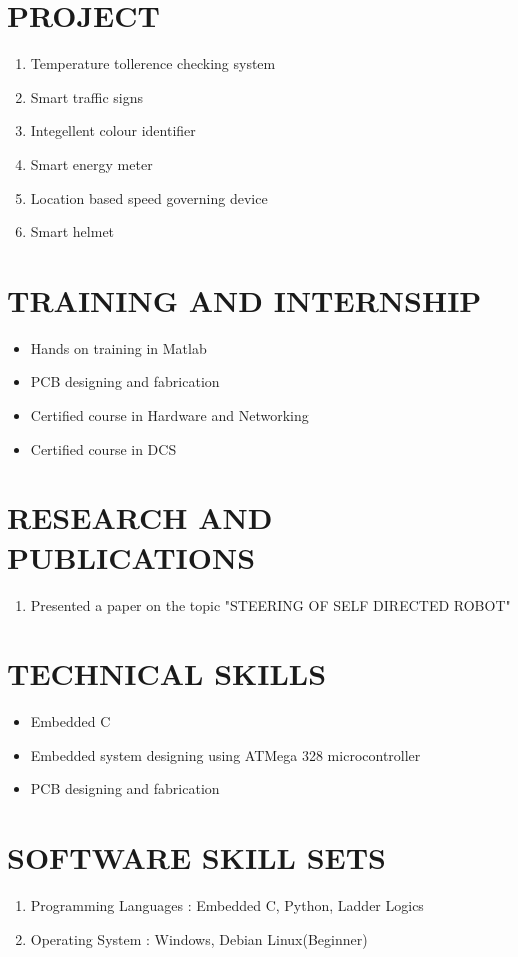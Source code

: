 \documentclass{My_CV_Class}
\begin{document}
\section{\textcolor{mycolor}{PROJECT}}
\begin{enumerate} 
	\item Temperature tollerence checking system
	\item Smart traffic signs
	\item Integellent colour identifier
	\item Smart energy meter
	\item Location based speed governing device
	\item Smart helmet
\end{enumerate}
\section{\textcolor{mycolor}{TRAINING AND INTERNSHIP}}
\begin{itemize}
	\item Hands on training in Matlab
	\item PCB designing and fabrication
	\item Certified course in Hardware and Networking
	\item Certified course in DCS
\end{itemize}
\section{\textcolor{mycolor}{RESEARCH AND PUBLICATIONS}}
\begin{enumerate}
	\item Presented a paper on the topic "STEERING OF SELF DIRECTED ROBOT"
\end{enumerate}
\section{\textcolor{mycolor}{TECHNICAL SKILLS}}
\begin{itemize}
	\item Embedded C 
	\item Embedded system designing using ATMega 328 microcontroller
	\item PCB designing and fabrication 
\end{itemize}
\newpage
\section{\textcolor{mycolor}{SOFTWARE SKILL SETS}}
\begin{enumerate}
	\item Programming Languages : Embedded C, Python, Ladder Logics
	\item Operating System      : Windows, Debian Linux(Beginner)
\end{enumerate}
\end{document}
